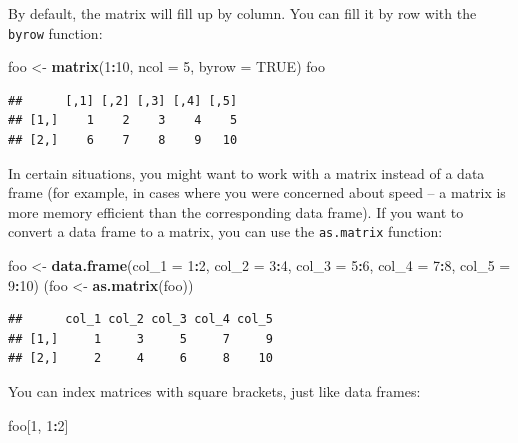 \documentclass[]{book}
\makeatletter
\newenvironment{Shaded}{\begin{snugshade}}{\end{snugshade}}
\newcommand{\KeywordTok}[1]{\textcolor[rgb]{0.13,0.29,0.53}{\textbf{#1}}}
\newcommand{\DataTypeTok}[1]{\textcolor[rgb]{0.13,0.29,0.53}{#1}}
\newcommand{\DecValTok}[1]{\textcolor[rgb]{0.00,0.00,0.81}{#1}}
\newcommand{\StringTok}[1]{\textcolor[rgb]{0.31,0.60,0.02}{#1}}
\newcommand{\OtherTok}[1]{\textcolor[rgb]{0.56,0.35,0.01}{#1}}
\newcommand{\OperatorTok}[1]{\textcolor[rgb]{0.81,0.36,0.00}{\textbf{#1}}}
\newcommand{\NormalTok}[1]{#1}
\newenvironment{kframe}{%
\medskip{}
\setlength{\fboxsep}{.8em}
 \def\at@end@of@kframe{}%
 \ifinner\ifhmode%
  \def\at@end@of@kframe{\end{minipage}}%
  \begin{minipage}{\columnwidth}%
 \fi\fi%
 \def\FrameCommand##1{\hskip\@totalleftmargin \hskip-\fboxsep
 \colorbox{shadecolor}{##1}\hskip-\fboxsep
     \hskip-\linewidth \hskip-\@totalleftmargin \hskip\columnwidth}%
 \MakeFramed {\advance\hsize-\width
   \@totalleftmargin\z@ \linewidth\hsize
   \@setminipage}}%
 {\par\unskip\endMakeFramed%
 \at@end@of@kframe}
\renewenvironment{Shaded}{\begin{kframe}}{\end{kframe}}
\theoremstyle{definition}
\theoremstyle{definition}
\theoremstyle{definition}
\theoremstyle{remark}
\makeatother
\begin{document}
By default, the matrix will fill up by column. You can fill it by row
with the \texttt{byrow} function:

\begin{Shaded}
\begin{Highlighting}[]
\NormalTok{foo <-}\StringTok{ }\KeywordTok{matrix}\NormalTok{(}\DecValTok{1}\OperatorTok{:}\DecValTok{10}\NormalTok{, }\DataTypeTok{ncol =} \DecValTok{5}\NormalTok{, }\DataTypeTok{byrow =} \OtherTok{TRUE}\NormalTok{)}
\NormalTok{foo}
\end{Highlighting}
\end{Shaded}

\begin{verbatim}
##      [,1] [,2] [,3] [,4] [,5]
## [1,]    1    2    3    4    5
## [2,]    6    7    8    9   10
\end{verbatim}

In certain situations, you might want to work with a matrix instead of a
data frame (for example, in cases where you were concerned about speed
-- a matrix is more memory efficient than the corresponding data frame).
If you want to convert a data frame to a matrix, you can use the
\texttt{as.matrix} function:

\begin{Shaded}
\begin{Highlighting}[]
\NormalTok{foo <-}\StringTok{ }\KeywordTok{data.frame}\NormalTok{(}\DataTypeTok{col_1 =} \DecValTok{1}\OperatorTok{:}\DecValTok{2}\NormalTok{, }\DataTypeTok{col_2 =} \DecValTok{3}\OperatorTok{:}\DecValTok{4}\NormalTok{,}
                  \DataTypeTok{col_3 =} \DecValTok{5}\OperatorTok{:}\DecValTok{6}\NormalTok{, }\DataTypeTok{col_4 =} \DecValTok{7}\OperatorTok{:}\DecValTok{8}\NormalTok{,}
                  \DataTypeTok{col_5 =} \DecValTok{9}\OperatorTok{:}\DecValTok{10}\NormalTok{)}
\NormalTok{(foo <-}\StringTok{ }\KeywordTok{as.matrix}\NormalTok{(foo))}
\end{Highlighting}
\end{Shaded}

\begin{verbatim}
##      col_1 col_2 col_3 col_4 col_5
## [1,]     1     3     5     7     9
## [2,]     2     4     6     8    10
\end{verbatim}

You can index matrices with square brackets, just like data frames:

\begin{Shaded}
\begin{Highlighting}[]
\NormalTok{foo[}\DecValTok{1}\NormalTok{, }\DecValTok{1}\OperatorTok{:}\DecValTok{2}\NormalTok{]}
\end{Highlighting}
\end{Shaded}
\end{document}
